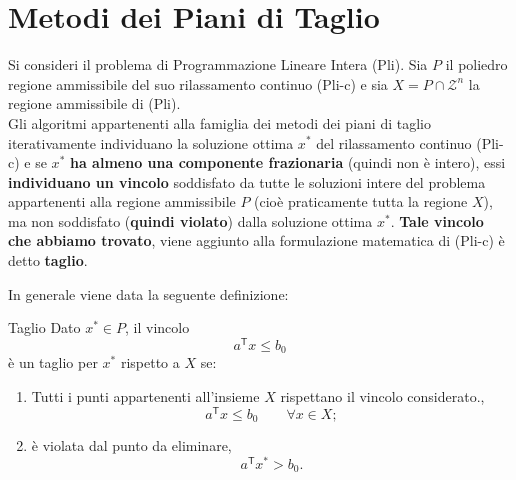 \begin{center}
\begin{minipage}{\linewidth}
\centering
\captionsetup{hypcap=false}
\label{fig:assegnamento}
\end{minipage}
\end{center}


\newpage

\section{Metodi dei Piani di Taglio}
\label{sec:piani-taglio}
Si consideri il problema di Programmazione Lineare Intera (Pli). Sia $P$ il poliedro regione ammissibile del suo rilassamento continuo (Pli-c)
e sia $X = P \cap \mathcal{Z}^n$ la regione ammissibile di (Pli). \\
Gli algoritmi appartenenti alla famiglia dei metodi dei piani di taglio iterativamente individuano la soluzione ottima $x^*$ del rilassamento continuo (Pli-c) e se $x^*$ \textbf{ha almeno una componente frazionaria} (quindi non è intero), essi \textbf{individuano un vincolo}
soddisfato da tutte le soluzioni intere del problema appartenenti alla regione ammissibile $P$ (cioè praticamente tutta la regione $X$), ma non soddisfato (\textbf{quindi violato}) dalla soluzione ottima $x^*$.
\textbf{Tale vincolo che abbiamo trovato}, viene aggiunto alla formulazione matematica di (Pli-c) è detto \textbf{taglio}.


In generale viene data la seguente definizione:
\begin{definition}{Taglio}
\label{def:taglio}
Dato \(x^*\in P\), il vincolo
\[
a^{\mathsf T}x\leq b_0
\]
è un taglio per \(x^*\) rispetto a \(X\) se:
\begin{enumerate}
\item[i.] Tutti i punti appartenenti all'insieme \(X\) rispettano il vincolo considerato.,
\[
a^{\mathsf T}x\leq b_0\qquad\forall x\in X;
\]
\item[ii.] è violata dal punto da eliminare,
\[
a^{\mathsf T}x^*>b_0.
\]
\end{enumerate}
\end{definition}

